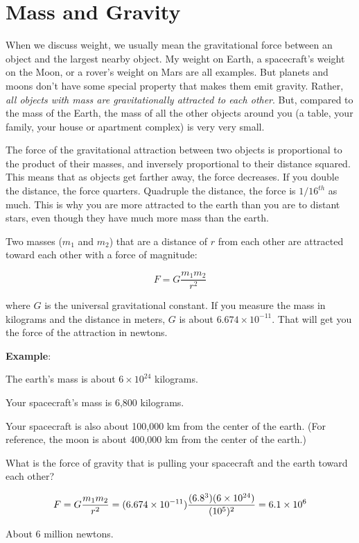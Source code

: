 \section{Mass and Gravity}
When we discuss weight, we usually mean the gravitational force between an object and the largest nearby object. My weight on Earth, a spacecraft's weight on the Moon, or a rover's weight on Mars are all examples. But planets and moons don't have some special property that makes them emit gravity. Rather, \textit{all objects with mass are gravitationally attracted to each other}. But, compared to the mass of the Earth, the mass of all the other objects around you (a table, your family, your house or apartment complex) is very very small. 

The
force of the gravitational attraction between two objects is proportional to the product
of their masses, and inversely proportional to their distance squared.
This means that as objects get farther away, the force decreases. If you double the distance, the force quarters. Quadruple the distance, the force is $1/16^{th}$ as much. 
This is why you are more attracted to the earth than you are to
distant stars, even though they have much more mass than the earth.

\begin{mdframed}[style=important, frametitle={Newton's Law of Universal Gravitation}]

Two masses ($m_1$ and $m_2$) that are a distance of
$r$ from each other are attracted toward each other with a force of
magnitude:

$$F = G\frac{m_1 m_2}{r^2}$$

where $G$ is the universal gravitational constant. If you measure the
mass in kilograms and the distance in meters, $G$ is about $6.674
\times 10^{-11}$. That will get you the force of the attraction in
newtons.

\end{mdframed}

\textbf{Example}: %

\begin{Exercise}[title={Gravity}, label=gravity_earth]

  The earth's mass is about $6 \times 10^{24}$ kilograms.

  Your spacecraft's mass is 6,800 kilograms.

  Your spacecraft is also about 100,000 km from the center of the earth. (For 
  reference, the moon is about 400,000 km from the center of the earth.)

  What is the force of gravity that is pulling your spacecraft and the earth 
  toward each other?

\end{Exercise}
\begin{Answer}[ref=gravity_earth]

  $$F = G\frac{m_1 m_2}{r^2} = (6.674 \times 10^{-11})\frac{(6.8 \time 10^3)(6 
  \times 10^{24})}{(10^5)^2} = 6.1 \times 10^{6}$$

  About 6 million newtons.

\end{Answer}

